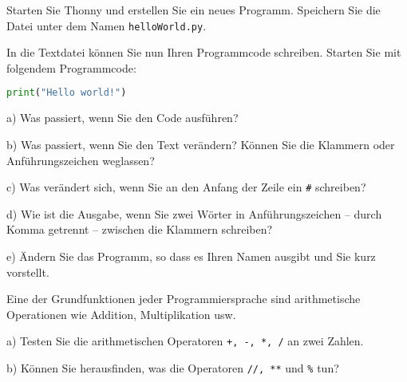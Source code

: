 \documentclass[11pt, a4paper, oneside]{article}
\begin{document}
	Starten Sie Thonny und erstellen Sie ein neues Programm.
	Speichern Sie die Datei unter dem Namen \texttt{helloWorld.py}.
	
	In die Textdatei können Sie nun Ihren Programmcode schreiben.
	Starten Sie mit folgendem Programmcode:
	
	\begin{lstlisting}[language=python]
print("Hello world!")
	\end{lstlisting}
	
	a) Was passiert, wenn Sie den Code ausführen?
	
	\lines[1cm]
	
	b) Was passiert, wenn Sie den Text verändern? Können Sie die Klammern oder Anführungszeichen weglassen?
	
	\lines[1cm]
	
	c) Was verändert sich, wenn Sie an den Anfang der Zeile ein \texttt{\#} schreiben?
	
	\lines[2cm]
	
	d) Wie ist die Ausgabe, wenn Sie zwei Wörter in Anführungszeichen -- durch Komma getrennt -- zwischen die Klammern schreiben?
	
	\lines[2cm]
	
	e) Ändern Sie das Programm, so dass es Ihren Namen ausgibt und Sie kurz vorstellt.
	
	
	
	Eine der Grundfunktionen jeder Programmiersprache sind arithmetische Operationen wie Addition, Multiplikation usw.
	
	a) Testen Sie die arithmetischen Operatoren \texttt{+, -, *, /} an zwei Zahlen.
	
	b) Können Sie herausfinden, was die Operatoren \texttt{//, **} und \texttt{\%} tun?
	
	\lines[3cm]
\end{document}
